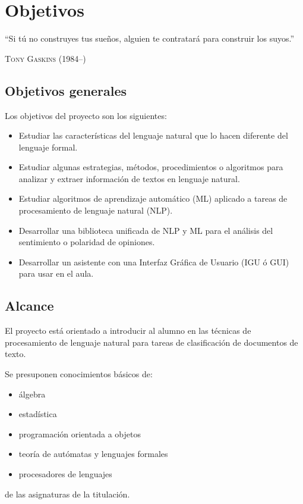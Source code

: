 
\chapter{Objetivos}

\epigraph{``Si tú no construyes tus sueños, alguien te contratará para construir los suyos.''}{\textsc{Tony Gaskins} (1984--)}

\section{Objetivos generales}

Los objetivos del proyecto son los siguientes:

\begin{itemize}
\item Estudiar las características del lenguaje natural que lo hacen diferente del lenguaje formal.
\item Estudiar algunas estrategias, métodos, procedimientos o algoritmos para analizar y extraer información de textos en lenguaje natural.
\item Estudiar algoritmos de aprendizaje automático (ML) aplicado a tareas de procesamiento de lenguaje natural (NLP).
\item Desarrollar una biblioteca unificada de NLP y ML para el análisis del sentimiento o polaridad de opiniones.
\item Desarrollar un asistente con una Interfaz Gráfica de Usuario (IGU ó GUI) para usar en el aula.
\end{itemize}

\section{Alcance}

El proyecto está orientado a introducir al alumno en las técnicas de procesamiento de lenguaje natural para tareas de clasificación de documentos de texto.

Se presuponen conocimientos básicos de:
\begin{itemize}
\item álgebra
\item estadística
\item programación orientada a objetos
\item teoría de autómatas y lenguajes formales
\item procesadores de lenguajes
\end{itemize}
de las asignaturas de la titulación.

